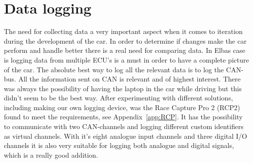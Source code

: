 \section{Data logging} 
The need for collecting data a very important aspect when
it comes to iteration during the development of the car. In order to determine
if changes make the car perform and handle better there is a real need for
comparing data.  In Elbas case is logging data from multiple ECU's is a must in
order to have a complete picture of the car. The absolute best way to log all
the relevant data is to log the CAN-bus. All the information sent on CAN is
relevant and of highest interest. There was always the possibility of having the
laptop in the car while driving but this didn't seem to be the best way. After
experimenting with different solutions, including making our own logging device,
was the Race Capture Pro 2 (RCP2) found to meet the requirements,
see Appendix~\ref{app:RCP}. It has the possibility to communicate with two CAN-channels
and logging different custom identifiers as virtual channels. With it's eight
analogue input channels and three digital I/O channels it is also very suitable
for logging both analogue and digital signals, which is a really good addition.

